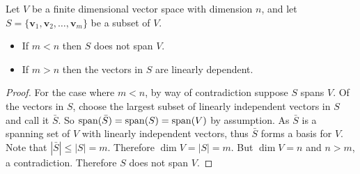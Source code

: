 \begin{theorem}\label{thrm-basis-is-smallest-spanning-and-largest-linearly-independent-set}
    Let $V$ be a finite dimensional vector space with dimension $n$, and let $S = \{\textbf{v}_1, \textbf{v}_2, \dots, \textbf{v}_m\}$ be a subset of $V$.
    \begin{itemize}
        \item If $m < n$ then $S$ does not span $V$.
        \item If $m > n$ then the vectors in $S$ are linearly dependent.
    \end{itemize}
\end{theorem}
\begin{proof}
    For the case where $m < n$, by way of contradiction suppose $S$ spans $V$. Of the vectors in $S$, choose the largest subset of linearly independent vectors in $S$ and call it $\bar{S}$. So $\mathrm{span}(\bar{S}) = \mathrm{span}(S) = \mathrm{span}(V)$ by assumption. As $\bar{S}$ is a spanning set of $V$ with linearly independent vectors, thus $\bar{S}$ forms a basis for $V$. Note that $|\bar{S}| \leq |S| = m$. Therefore $\dim V = |S| = m$. But $\dim V = n$ and $n > m$, a contradiction. Therefore $S$ does not span $V$.


\end{proof}
